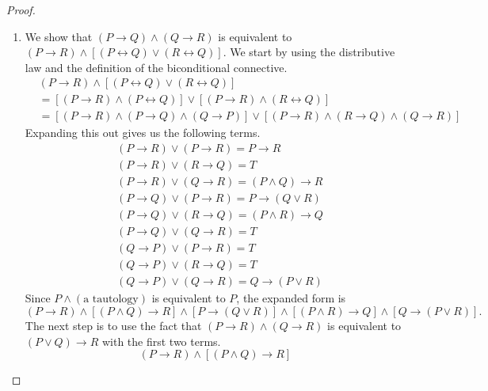 \documentclass[12pt]{amsart}
\theoremstyle{definition}
\theoremstyle{remark}
\begin{document}
\begin{proof}
\hfill
\begin{enumerate}
	\item We show that $(P \rightarrow Q) \wedge (Q \rightarrow R)$ is equivalent to $(P \rightarrow R) \wedge [(P \leftrightarrow Q) \vee (R \leftrightarrow Q)]$.
	We start by using the distributive law and the definition of the biconditional connective.
	\begin{align*}
		& (P \rightarrow R) \wedge [(P \leftrightarrow Q) \vee (R \leftrightarrow Q)] \\
		&= [(P \rightarrow R) \wedge (P \leftrightarrow Q)]
			\vee [(P \rightarrow R) \wedge (R \leftrightarrow Q)] \\
		&= [(P \rightarrow R) \wedge (P \rightarrow Q) \wedge (Q \rightarrow P)]
			\vee [(P \rightarrow R) \wedge (R \rightarrow Q) \wedge (Q \rightarrow R)]
	\end{align*}
	Expanding this out gives us the following terms.
	\begin{align*}
		& (P \rightarrow R) \vee (P \rightarrow R) = P \rightarrow R \\
		& (P \rightarrow R) \vee (R \rightarrow Q) = T \\
		& (P \rightarrow R) \vee (Q \rightarrow R) = (P \wedge Q) \rightarrow R \\
		& (P \rightarrow Q) \vee (P \rightarrow R) = P \rightarrow (Q \vee R) \\
		& (P \rightarrow Q) \vee (R \rightarrow Q) = (P \wedge R) \rightarrow Q \\
		& (P \rightarrow Q) \vee (Q \rightarrow R) = T \\
		& (Q \rightarrow P) \vee (P \rightarrow R) = T \\
		& (Q \rightarrow P) \vee (R \rightarrow Q) = T \\
		& (Q \rightarrow P) \vee (Q \rightarrow R) = Q \rightarrow (P \vee R)
	\end{align*}
	Since $P \wedge (\text{a tautology})$ is equivalent to $P$, the expanded form is
	\begin{equation*}
		(P \rightarrow R) \wedge [(P \wedge Q) \rightarrow R]
		\wedge [P \rightarrow (Q \vee R)] \wedge [(P \wedge R) \rightarrow Q]
		\wedge [Q \rightarrow (P \vee R)].
	\end{equation*}
	The next step is to use the fact that $(P \rightarrow R) \wedge (Q \rightarrow R)$ is equivalent to $(P \vee Q) \rightarrow R$ with the first two terms.
	\begin{equation*}
		(P \rightarrow R) \wedge [(P \wedge Q) \rightarrow R]

\end{equation*}
\end{enumerate}
\end{proof}
\end{document}
